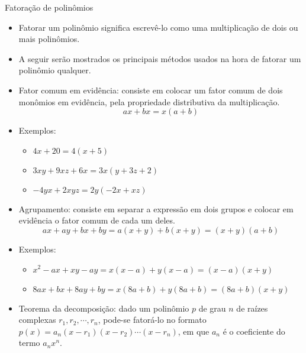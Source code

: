 \documentclass[14pt, aspectratio=169]{beamer}
\newcommand{\skipframe}{\vspace{10.0cm}}
\begin{document}
\begin{frame}[allowframebreaks]{Fatoração de polinômios}

\begin{itemize}

    \item Fatorar um polinômio significa escrevê-lo como uma multiplicação de dois ou mais polinômios.

    \item A seguir serão mostrados os principais métodos usados na hora de fatorar um polinômio qualquer.

    \skipframe

    \item Fator comum em evidência: consiste em colocar um fator comum de dois monômios em evidência, pela propriedade distributiva da multiplicação.
    \begin{equation*}
        ax + bx = x(a + b)
    \end{equation*}

    \item Exemplos:
    \begin{itemize}
        \item $4x + 20 = 4(x+5)$
        \item $3xy + 9xz + 6x = 3x(y + 3z + 2)$
        \item $-4yx + 2xyz = 2y(-2x + xz)$
    \end{itemize}

    \skipframe

    \item Agrupamento: consiste em separar a expressão em dois grupos e colocar em evidência o fator comum de cada um deles.
    \begin{equation*}
        ax + ay + bx + by = a(x+y) + b(x+y) = (x+y)(a+b)
    \end{equation*}

    \item Exemplos:
    \begin{itemize}
        \item $x^2 - ax + xy - ay = x(x-a) + y(x-a) = (x-a)(x+y)$
        \item $8ax + bx + 8ay + by = x(8a+b) + y(8a+b) = (8a + b)(x+y)$
    \end{itemize}

    \skipframe

    \item Teorema da decomposição: dado um polinômio $p$ de grau $n$ de raízes complexas $r_1, r_2, \cdots, r_n$, pode-se fatorá-lo no formato $p(x) = a_n(x - r_1)(x - r_2) \cdots (x - r_n)$, em que $a_n$ é o coeficiente do termo $a_n x^n$.


\end{itemize}
\end{frame}
\end{document}

